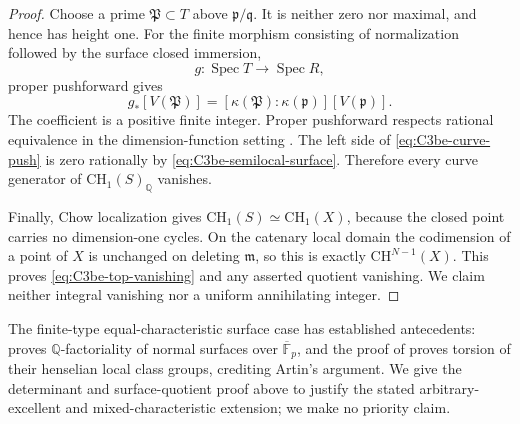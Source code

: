 \begin{proof}
Choose a prime \(\mathfrak P\subset T\) above
\(\mathfrak p/\mathfrak q\). It is neither zero nor maximal,
and hence has height one. For the finite morphism consisting
of normalization followed by the surface closed immersion,
\[
              g:\operatorname{Spec}T
                            \longrightarrow\operatorname{Spec}R,
\]
proper pushforward gives
\begin{equation}\label{eq:C3be-curve-push}
       g_*[V(\mathfrak P)]
          =[\kappa(\mathfrak P):\kappa(\mathfrak p)]
                                      [V(\mathfrak p)].
\end{equation}
The coefficient is a positive finite integer. Proper pushforward
respects rational equivalence in the dimension-function setting
\citep[Lemma 42.20.3, Tag 02S2]{frC3beStacksProperPush}.
The left side of \eqref{eq:C3be-curve-push} is zero rationally
by \eqref{eq:C3be-semilocal-surface}. Therefore every curve generator
of \(\mathrm{CH}_1(S)_{\mathbb Q}\) vanishes.

Finally, Chow localization
\citep[Lemma 42.19.3, Tag 02RX]{frC3beStacksChowLocalization}
gives \(\mathrm{CH}_1(S)\simeq\mathrm{CH}_1(X)\), because
the closed point carries no dimension-one cycles. On the
catenary local domain the codimension of a point of \(X\)
is unchanged on deleting \(\mathfrak m\), so this is exactly
\(\mathrm{CH}^{N-1}(X)\). This proves
\eqref{eq:C3be-top-vanishing} and any asserted quotient
vanishing. We claim neither integral vanishing nor a uniform
annihilating integer.
\end{proof}

The finite-type equal-characteristic surface case has established
antecedents: \citet[Theorem 4.5, p. 42, proof and Remark 4.9,
p. 43]{frC3beTanaka2014} proves \(\mathbb Q\)-factoriality of
normal surfaces over \(\overline{\mathbb F}_p\), and the proof
of \citet[Theorem 2.4, author pp. 4--5]{frC3beEsser2023}
proves torsion of their henselian local class groups, crediting
Artin's argument. We give the determinant and surface-quotient
proof above to justify the stated arbitrary-excellent and
mixed-characteristic extension; we make no priority claim.
